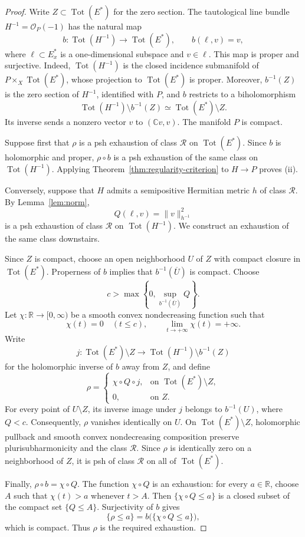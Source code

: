 \documentclass[11pt]{amsart}
\theoremstyle{definition}
\theoremstyle{remark}
\numberwithin{equation}{section}
\newcommand{\C}{\mathbb C}
\newcommand{\R}{\mathbb R}
\newcommand{\OO}{\mathcal O}
\newcommand{\Tot}{\operatorname{Tot}}
\begin{document}
\begin{proof}
Write $Z\subset\Tot(E^*)$ for the zero section. The
tautological line bundle $H^{-1}=\OO_P(-1)$ has the natural map
\[
 b:\Tot(H^{-1})\longrightarrow\Tot(E^*),\qquad b(\ell,v)=v,
\]
where $\ell\subset E_x^*$ is a one-dimensional subspace
and $v\in\ell$. This map is proper and surjective. Indeed,
$\Tot(H^{-1})$ is the closed incidence submanifold of
$P\times_X\Tot(E^*)$, whose projection to $\Tot(E^*)$
is proper. Moreover, $b^{-1}(Z)$ is the zero section of
$H^{-1}$, identified with $P$, and $b$ restricts to a
biholomorphism
\[
 \Tot(H^{-1})\setminus b^{-1}(Z)
 \simeq\Tot(E^*)\setminus Z.
\]
Its inverse sends a nonzero vector $v$ to $(\C v,v)$.
The manifold $P$ is compact.

Suppose first that $\rho$ is a psh exhaustion of class
$\mathcal R$ on $\Tot(E^*)$. Since $b$ is holomorphic
and proper, $\rho\circ b$ is a psh exhaustion of the same
class on $\Tot(H^{-1})$. Applying
Theorem~\ref{thm:regularity-criterion} to $H\to P$
proves \textup{(ii)}.

Conversely, suppose that $H$ admits a semipositive
Hermitian metric $h$ of class $\mathcal R$. By
Lemma~\ref{lem:norm},
\[
 Q(\ell,v)=\|v\|_{h^{-1}}^2
\]
is a psh exhaustion of class $\mathcal R$ on
$\Tot(H^{-1})$. We construct an exhaustion of the same
class downstairs.

Since $Z$ is compact, choose an open neighborhood $U$
of $Z$ with compact closure in $\Tot(E^*)$. Properness
of $b$ implies that $b^{-1}(\overline U)$ is compact.
Choose
\[
 c>\max\left\{0,\sup_{b^{-1}(\overline U)}Q\right\}.
\]
Let $\chi:\R\to[0,\infty)$ be a smooth convex
nondecreasing function such that
\[
 \chi(t)=0\quad(t\le c),\qquad
 \lim_{t\to+\infty}\chi(t)=+\infty.
\]
Write
\[
 j:\Tot(E^*)\setminus Z
 \longrightarrow\Tot(H^{-1})\setminus b^{-1}(Z)
\]
for the holomorphic inverse of $b$ away from $Z$, and define
\[
 \rho=
 \begin{cases}
  \chi\circ Q\circ j,&\text{on }\Tot(E^*)\setminus Z,\\
  0,&\text{on }Z.
 \end{cases}
\]
For every point of $U\setminus Z$, its inverse image under
$j$ belongs to $b^{-1}(U)$, where $Q<c$. Consequently,
$\rho$ vanishes identically on $U$. On $\Tot(E^*)\setminus Z$,
holomorphic pullback and smooth convex nondecreasing
composition preserve plurisubharmonicity and the class
$\mathcal R$. Since $\rho$ is identically zero on a
neighborhood of $Z$, it is psh of class $\mathcal R$
on all of $\Tot(E^*)$.

Finally, $\rho\circ b=\chi\circ Q$. The function
$\chi\circ Q$ is an exhaustion: for every $a\in\R$,
choose $A$ such that $\chi(t)>a$ whenever $t>A$.
Then $\{\chi\circ Q\le a\}$ is a closed subset of the
compact set $\{Q\le A\}$. Surjectivity of $b$ gives
\[
 \{\rho\le a\}=b\bigl(\{\chi\circ Q\le a\}\bigr),
\]
which is compact. Thus $\rho$ is the required exhaustion.
\end{proof}
\end{document}
